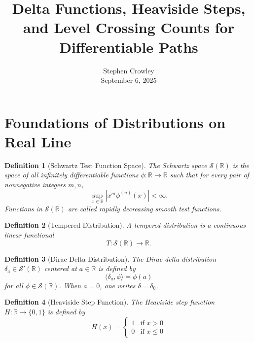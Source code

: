 \documentclass{article}
\newcommand{\tmaffiliation}[1]{\\ #1}
\newtheorem{definition}{Definition}
\begin{document}
\title{Delta Functions, Heaviside Steps, and Level Crossing Counts for
Differentiable Paths}

\author{
  Stephen Crowley
  \tmaffiliation{September 6, 2025}
}

\date{}

\maketitle

{\tableofcontents}

\section{Foundations of Distributions on Real Line}

\begin{definition}
  [Schwartz Test Function Space] The Schwartz space $\mathcal{S} (\mathbb{R})$
  is the space of all infinitely differentiable functions $\phi : \mathbb{R}
  \to \mathbb{R}$ such that for every pair of nonnegative integers $m, n$,
  \[ \sup_{x \in \mathbb{R}} |x^m \phi^{(n)} (x) | < \infty . \]
  Functions in $\mathcal{S} (\mathbb{R})$ are called rapidly decreasing smooth
  test functions.
\end{definition}

\begin{definition}
  [Tempered Distribution] A tempered distribution is a continuous linear
  functional
  \[ T : \mathcal{S} (\mathbb{R}) \to \mathbb{R}. \]
\end{definition}

\begin{definition}
  [Dirac Delta Distribution] The Dirac delta distribution $\delta_a \in
  \mathcal{S}' (\mathbb{R})$ centered at $a \in \mathbb{R}$ is defined by
  \[ \langle \delta_a, \phi \rangle = \phi (a) \]
  for all $\phi \in \mathcal{S} (\mathbb{R})$. When $a = 0$, one writes
  $\delta = \delta_0$.
\end{definition}

\begin{definition}
  [Heaviside Step Function] The Heaviside step function $H : \mathbb{R} \to
  \{0, 1\}$ is defined by
  \[ H (x) = \left\{\begin{array}{ll}
       1 & \text{if } x > 0\\
       0 & \text{if } x \leq 0
     \end{array}\right. \]
\end{definition}
\end{document}
